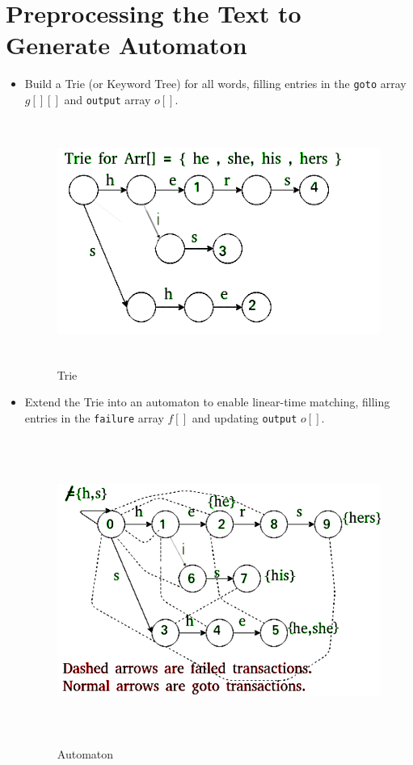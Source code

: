 \documentclass[11pt,a4paper]{article}
\begin{document}
\section*{Preprocessing the Text to Generate Automaton}
\begin{itemize}
    \item Build a Trie (or Keyword Tree) for all words, filling entries in the \texttt{goto} array $g[][]$ and \texttt{output} array $o[]$.
    \begin{figure}[H]
    \centering
    \includegraphics[width=12cm, height=8cm]{aho1.png}
    \caption{Trie}
    \end{figure}
    \item Extend the Trie into an automaton to enable linear-time matching, filling entries in the \texttt{failure} array $f[]$ and updating \texttt{output} $o[]$.
    \begin{figure}[H]
    \centering
    \includegraphics[width=14cm, height=10cm]{aho2.png}
    \caption{Automaton}
    \end{figure}
\end{itemize}
\end{document}
